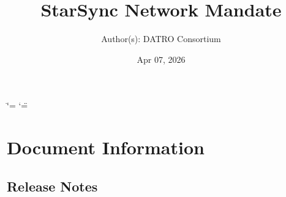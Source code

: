 \documentclass[letterpaper,10pt,openany,oneside,english]{sphinxmanual}
\title{StarSync Network Mandate}
\date{Apr 07, 2026}
\author{Author(s): DATRO Consortium}
\begin{document}
\ifdefined\shorthandoff
  \ifnum\catcode`\=\string=\active\shorthandoff{=}\fi
  \ifnum\catcode`\"=\active{}\fi
\fi

\pagestyle{empty}
\sphinxmaketitle
\pagestyle{plain}
\sphinxtableofcontents
\pagestyle{normal}
\label{\detokenize{index::doc}}



\chapter{Document Information}
\label{\detokenize{index:document-information}}
\sphinxstepscope


\section{Release Notes}
\end{document}
